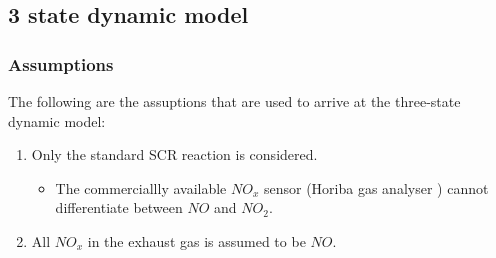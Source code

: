 \subsection{3 state dynamic model}
\subsubsection{Assumptions \cite{devarakonda2009model}}
The following are the assuptions that are used to arrive at the three-state dynamic model:
\begin{enumerate}
    \item Only the standard SCR reaction is considered.
    \begin{itemize}
        \item The commerciallly available $NO_x$ sensor (Horiba gas analyser \cite{nova2014urea}) cannot differentiate between $NO$ and $NO_2$.
    \end{itemize}

    \item All $NO_x$ in the exhaust gas is assumed to be $NO$.

\end{enumerate}

